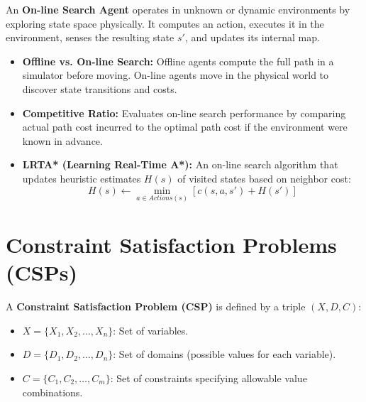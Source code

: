 \documentclass[12pt,a4paper]{article}
\begin{document}
\begin{tcolorbox}[defbox, title={On-line Search Agent}]
  An \textbf{On-line Search Agent} operates in unknown or dynamic environments by exploring state space physically. It computes an action, executes it in the environment, senses the resulting state $s'$, and updates its internal map.
\end{tcolorbox}

\begin{itemize}[leftmargin=*, itemsep=3pt]
  \item \textbf{Offline vs. On-line Search:} Offline agents compute the full path in a simulator before moving. On-line agents move in the physical world to discover state transitions and costs.
  \item \textbf{Competitive Ratio:} Evaluates on-line search performance by comparing actual path cost incurred to the optimal path cost if the environment were known in advance.
  \item \textbf{LRTA* (Learning Real-Time A*):} An on-line search algorithm that updates heuristic estimates $H(s)$ of visited states based on neighbor cost:
    \begin{equation}
      H(s) \leftarrow \min_{a \in Actions(s)} \left[ c(s, a, s') + H(s') \right]
    \end{equation}
\end{itemize}

\section{Constraint Satisfaction Problems (CSPs)}

\begin{tcolorbox}[defbox, title={Definition of a CSP}]
  A \textbf{Constraint Satisfaction Problem (CSP)} is defined by a triple $(X, D, C)$:
  \begin{itemize}[leftmargin=*, noitemsep]
    \item $X = \{X_1, X_2, \dots, X_n\}$: Set of variables.
    \item $D = \{D_1, D_2, \dots, D_n\}$: Set of domains (possible values for each variable).
    \item $C = \{C_1, C_2, \dots, C_m\}$: Set of constraints specifying allowable value combinations.
  \end{itemize}
\end{tcolorbox}
\end{document}
